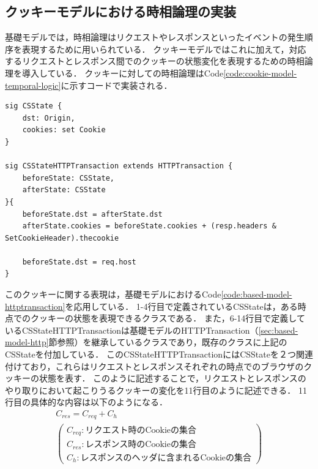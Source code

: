 \documentclass[12pt,a4paper]{jbook}
\begin{document}
\subsection{クッキーモデルにおける時相論理の実装}
基礎モデルでは，時相論理はリクエストやレスポンスといったイベントの発生順序を表現するために用いられている．
クッキーモデルではこれに加えて，対応するリクエストとレスポンス間でのクッキーの状態変化を表現するための時相論理を導入している．
クッキーに対しての時相論理はCode\ref{code:cookie-model-temporal-logic}に示すコードで実装される．
\begin{lstlisting}[caption=クッキーに対する時相論理, label=code:cookie-model-temporal-logic]
sig CSState {
	dst: Origin,
	cookies: set Cookie
}

sig CSStateHTTPTransaction extends HTTPTransaction {
	beforeState: CSState,
	afterState: CSState
}{
	beforeState.dst = afterState.dst
	afterState.cookies = beforeState.cookies + (resp.headers & SetCookieHeader).thecookie
	
	beforeState.dst = req.host
}
\end{lstlisting}
このクッキーに関する表現は，基礎モデルにおけるCode\ref{code:based-model-httptransaction}を応用している．
1-4行目で定義されているCSStateは，ある時点でのクッキーの状態を表現できるクラスである．
また，6-14行目で定義しているCSStateHTTPTransactionは基礎モデルのHTTPTransaction（\ref{sec:based-model-http}節参照）を継承しているクラスであり，既存のクラスに上記のCSStateを付加している．
このCSStateHTTPTransactionにはCSStateを２つ関連付けており，これらはリクエストとレスポンスそれぞれの時点でのブラウザのクッキーの状態を表す．
このように記述することで，リクエストとレスポンスのやり取りにおいて起こりうるクッキーの変化を11行目のように記述できる．
11行目の具体的な内容は以下のようになる．
\begin{eqnarray*}
& C_{res} = C_{req} + C_{h} &\\
& \left(
\begin{array}{l}
	C_{req} : \mbox{リクエスト時のCookieの集合}\\
	C_{res} : \mbox{レスポンス時のCookieの集合}\\
	C_{h} : \mbox{レスポンスのヘッダに含まれるCookieの集合}
\end{array}
\right) &
\end{eqnarray*}
\end{document}
